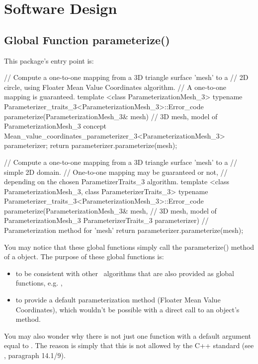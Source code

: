 \section{Software Design}

\subsection{Global Function parameterize()}

This package's entry point is:

\begin{ccExampleCode}
// Compute a one-to-one mapping from a 3D triangle surface 'mesh' to a
// 2D circle, using Floater Mean Value Coordinates algorithm.
// A one-to-one mapping is guaranteed.
template <class ParameterizationMesh_3>
typename Parameterizer_traits_3<ParameterizationMesh_3>::Error_code
parameterize(ParameterizationMesh_3& mesh)  // 3D mesh, model of ParameterizationMesh_3 concept
{
    Mean_value_coordinates_parameterizer_3<ParameterizationMesh_3> parameterizer;
    return parameterizer.parameterize(mesh);
}

// Compute a one-to-one mapping from a 3D triangle surface 'mesh' to a
// simple 2D domain.
// One-to-one mapping may be guaranteed or not,
// depending on the chosen ParametizerTraits_3 algorithm.
template <class ParameterizationMesh_3, class ParameterizerTraits_3>
typename Parameterizer_traits_3<ParameterizationMesh_3>::Error_code
parameterize(ParameterizationMesh_3& mesh,          // 3D mesh, model of ParameterizationMesh_3
             ParameterizerTraits_3 parameterizer)   // Parameterization method for 'mesh'
{
    return parameterizer.parameterize(mesh);
}
\end{ccExampleCode}

You may notice that these global functions simply call the
parameterize() method of a  object.
The purpose of these global functions is:
\begin{itemize}
\item to be consistent with other \cgal\ algorithms that are also provided as
      global functions, e.g. ,
\item to provide a default parameterization method (Floater Mean Value Coordinates),
      which wouldn't be possible with a direct call to an object's method.
\end{itemize}

You may also wonder why there is not just one  function
with a default  argument equal to
.
The reason is simply that this is not allowed by the C++ standard (see
\cite{cgal:ansi-is14882-98}, paragraph 14.1/9).


